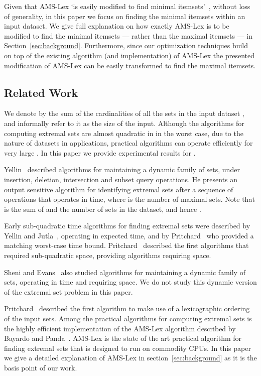 \documentclass[13pt,a4paper]{article}
\begin{document}
Given that AMS-Lex `is easily modified to find minimal itemsets'~\cite{BayardoPanda11}, without loss of generality, in this paper we focus on finding the minimal itemsets within an input dataset. We give full explanation on how exactly AMS-Lex is to be modified to find the minimal itemsets --- rather than the maximal itemsets \cite{BayardoPanda11} --- in Section~\ref{sec:background}. Furthermore, since our optimization techniques build on top of the existing algorithm (and implementation) of AMS-Lex the presented modification of AMS-Lex can be easily transformed to find the maximal itemsets.


\subsection{Related Work}
\label{sec:intro:related_work}
\noindent

We denote by  the sum of the cardinalities of all the sets in the input dataset , and informally refer to it as the size of the input. Although the algorithms for computing extremal sets are almost quadratic in  in the worst case, due to the nature of datasets in applications, practical algorithms can operate efficiently for very large  \cite{BayardoPanda11}. In this paper we provide experimental results for .

Yellin~\cite{Yellin92} described algorithms for maintaining a dynamic family of sets, under insertion, deletion, intersection and subset query operations. He presents an output sensitive algorithm for identifying extremal sets after a sequence of  operations that operates in  time, where  is the number of maximal sets. Note that  is the sum of  and the number of sets in the dataset, and hence .

Early sub-quadratic time algorithms for finding extremal sets were described by Yellin and Jutla~\cite{YellinJutla93}, operating in  expected time, and by Pritchard~\cite{Pritchard97} who provided a matching worst-case time bound. Pritchard~\cite{Pritchard91} described the first algorithms that required sub-quadratic space, providing algorithms requiring  space.

Sheni and Evans~\cite{Shen96} also studied algorithms for maintaining a dynamic family of sets, operating in time  and requiring  space.
We do not study this dynamic version of the extremal set problem in this paper. 

Pritchard~\cite{Pritchard97} described the first algorithm to make use of a lexicographic ordering of the input sets. Among the practical algorithms for computing extremal sets is the highly efficient implementation of the AMS-Lex algorithm described by Bayardo and Panda~\cite{BayardoPanda11}. AMS-Lex is the state of the art practical algorithm for finding extremal sets that is designed to run on commodity CPUs. In this paper we give a detailed explanation of AMS-Lex in section~\ref{sec:background} as it is the basis point of our work.
\end{document}
